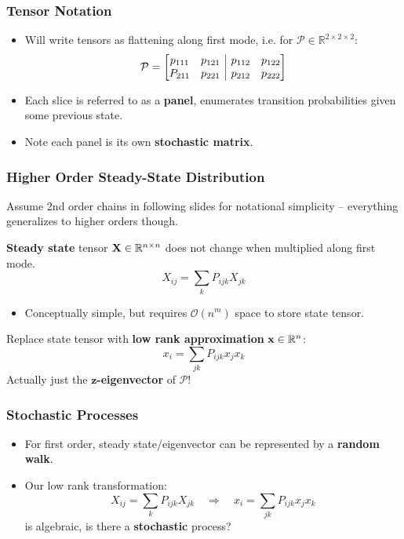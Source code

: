 \documentclass{beamer}
\begin{document}
\begin{frame}
\frametitle{Tensor Notation}
\begin{itemize}

\item Will write tensors as flattening along first mode, i.e. for $\mathcal{P} \in \mathbb{R}^{2 \times 2 \times 2}$:
	\[ \mathcal{P} = \left[
      \begin{array}{@{}cc|cc@{}}
        p_{111} & p_{121} & p_{112} & p_{122} \\
        P_{211} & p_{221} & p_{212} & p_{222}
      \end{array}
    \right]
 \]	
\item Each slice is referred to as a \textbf{panel}, enumerates transition probabilities given some previous state.
 
\item Note each panel is its own \textbf{stochastic matrix}.
\end{itemize}
\end{frame}

\begin{frame}
\frametitle{Higher Order Steady-State Distribution}

Assume 2nd order chains in following slides for notational simplicity -- everything generalizes to higher orders though.

\begin{block}{}
\textbf{Steady state} tensor ${\bf X} \in \mathbb{R}^{n \times n}$ does not change when multiplied along first mode.
\[ X_{ij} = \sum_k P_{ijk} X_{jk} \]
\end{block}
\begin{itemize}
\item Conceptually simple, but requires $\mathcal{O}\left(n^m\right)$ space to store state tensor.
\end{itemize}
\begin{block}{}
Replace state tensor with \textbf{low rank approximation} ${\bf x} \in \mathbb{R}^n$:
\[ x_i = \sum_{jk} P_{ijk} x_j x_k \]
Actually just the \textbf{$\boldsymbol{z}$-eigenvector} of $\mathcal{P}$!
\end{block}

\end{frame}

\begin{frame}
\frametitle{Stochastic Processes}

\begin{itemize}
\item For first order, steady state/eigenvector can be represented by a {\bf random walk}.
\item Our low rank transformation:
\[ X_{ij} = \sum_k P_{ijk} X_{jk} \quad \Rightarrow \quad x_i = \sum_{jk} P_{ijk} x_j x_k \]
is algebraic, is there a {\bf stochastic} process?
\end{itemize}

\end{frame}
\end{document}
